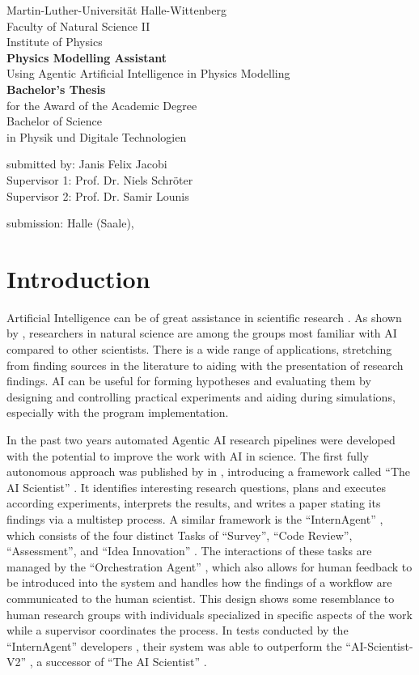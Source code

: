 \documentclass[
	fontsize = 11pt,
	paper = a4,
	draft = false,
	twoside = true,
	titlepage = false
]{scrartcl}
\newcommand{\institution}{Martin-Luther-Universität Halle-Wittenberg}
\newcommand{\institute}{Faculty of Natural Science II\\Institute of Physics}
\newcommand{\dTitle}{Physics Modelling Assistant}
\newcommand{\subTitle}{Using Agentic Artificial Intelligence in Physics Modelling}
\newcommand{\documentType}{\textbf{Bachelor's Thesis}\\
	for the Award of the Academic Degree\\
	Bachelor of Science\\
	in Physik und Digitale Technologien}
\newcommand{\aauthor}{Janis Felix Jacobi}
\newcommand{\supervisorO}{Prof. Dr. Niels Schröter}
\newcommand{\supervisorT}{Prof. Dr. Samir Lounis}
\newcommand{\makeTitlePage}{
	\thispagestyle{empty}
	\begin{center}
		\Large\institution\\
		\Large \institute\\
		\vspace{3cm}
		\Huge{\bfseries \dTitle}\\
		\vspace{0.4cm}
		\huge \subTitle\\
		\vspace{3cm}
		\Large \documentType
		\vspace{0.4cm}
	
		\Large submitted by: \aauthor\\
		\vspace{0.4cm}
		\Large Supervisor 1: \supervisorO\\
		\vspace{0.1cm}
		\Large Supervisor 2: \supervisorT
		
	
		
		\Large submission: Halle (Saale), \DTMusedate{thesisdate}
	\end{center}
}
\numberwithin{equation}{subsection}
\begin{document}
	\makeTitlePage
	\pagebreak
	\begingroup
		\tableofcontents
		\thispagestyle{scrheadings}
	\endgroup
	\pagebreak
	\begingroup
		\listoffigidx
		
		\listoftabidx
		\glsaddall
		\printglossaries
		\thispagestyle{scrheadings}
	\endgroup
	\pagebreak
	\section{Introduction}
	Artificial Intelligence can be of great assistance in scientific research \autocite{aiHistWang}. As shown by \citeauthor{aiUseStat} \autocite{aiUseStat}, researchers in natural science are among the groups most familiar with \gls{AI} compared to other scientists. There is a wide range of applications, stretching from finding sources in the literature to aiding with the presentation of research findings. \gls{AI} can be useful for forming hypotheses and evaluating them by designing and controlling practical experiments and aiding during simulations, especially with the program implementation. \autocite{aiHistWang}
	
	In the past two years automated \gls{Agentic AI} research pipelines were developed with the potential to improve the work with \gls{AI} in science. The first fully autonomous approach was published by \citeauthor{aiScientist} in  \autocite{aiScientist}, introducing a framework called \enquote{The AI Scientist} \autocite{aiScientist}. It identifies interesting research questions, plans and executes according experiments, interprets the results, and writes a paper stating its findings via a multistep process. A similar framework is the \enquote{InternAgent} \autocite{internAgent}, which consists of the four distinct Tasks of \enquote{Survey}, \enquote{Code Review}, \enquote{Assessment}, and \enquote{Idea Innovation} \autocite{internAgent}. The interactions of these tasks are managed by the \enquote{Orchestration Agent} \autocite{internAgent}, which also allows for human feedback to be introduced into the system and handles how the findings of a workflow are communicated to the human scientist. This design shows some resemblance to human research groups with individuals specialized in specific aspects of the work while a supervisor coordinates the process. In tests conducted by the \enquote{InternAgent} developers \autocite{internAgent}, their system was able to outperform the \enquote{AI-Scientist-V2} \autocite{aiSci2}, a successor of \enquote{The AI Scientist} \autocite{aiScientist}.
	
\end{document}
